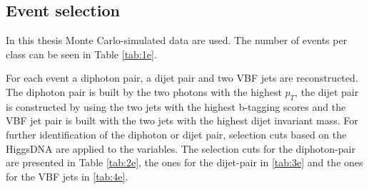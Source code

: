 \subsection{Event selection}
\label{sec:HiggsDNA}

In this thesis Monte Carlo-simulated data are used. The number of events per class can be seen in Table \ref{tab:1e}.


For each event a diphoton pair, a dijet pair and two VBF jets are reconstructed. The diphoton pair is built by the two photons with the highest $p_T$, the dijet pair is constructed by using the two jets
with the highest b-tagging scores and the VBF jet pair is built with the two jets with the highest dijet invariant mass.
For further identification of the diphoton or dijet pair, selection cuts based on the HiggsDNA are applied to the variables. The selection
cuts for the diphoton-pair are presented in Table \ref{tab:2e}, the ones for the dijet-pair in \ref{tab:3e} and the ones for the VBF jets in \ref{tab:4e}. \\


